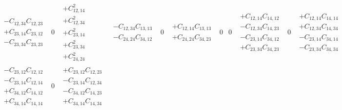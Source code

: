 \documentclass[pra,nofootinbib]{revtex4-1}
\newcommand{\C}[2]{C_{{#1},{#2}}}
\begin{document}
\begin{eqnarray}
\begin{array}{cccccccccccccccc}
\begin{array}{c}
     - \C{12}{34}\C{12}{23} \\
     + \C{23}{14}\C{23}{12} \\
     - \C{23}{34}\C{23}{23}
     \end{array} &
     0 &
     \begin{array}{c}
     + \C{12}{14}^2 \\
     + \C{12}{34}^2 \\
     + \C{23}{14}^2 \\
     + \C{23}{34}^2 \\
     + \C{24}{24}^2
     \end{array} &
     \begin{array}{c}
     - \C{12}{34}\C{13}{13} \\
     - \C{24}{24}\C{34}{12}
     \end{array} &
     0 &
     \begin{array}{c}
     + \C{12}{14}\C{13}{13} \\
     + \C{24}{24}\C{34}{23}
     \end{array} &
     0 &
     0 &
     \begin{array}{c}
     + \C{12}{14}\C{14}{12} \\
     - \C{12}{34}\C{14}{23} \\
     - \C{23}{14}\C{34}{12} \\
     + \C{23}{34}\C{34}{23}
     \end{array} &
     0 &
     \begin{array}{c}
     + \C{12}{14}\C{14}{14} \\
     + \C{12}{34}\C{14}{34} \\
     - \C{23}{14}\C{34}{14} \\
     - \C{23}{34}\C{34}{34} 
     \end{array} \\
     \begin{array}{c}
     - \C{23}{12}\C{12}{12} \\
     - \C{23}{14}\C{12}{14} \\
     + \C{34}{12}\C{14}{12} \\
     + \C{34}{14}\C{14}{14} 
     \end{array} &
     0 &
     \begin{array}{c}
     + \C{23}{12}\C{12}{23} \\
     - \C{23}{14}\C{12}{34} \\
     - \C{34}{12}\C{14}{23} \\
     + \C{34}{14}\C{14}{34}
     \end{array} &

\end{array}
\end{eqnarray}
\end{document}
